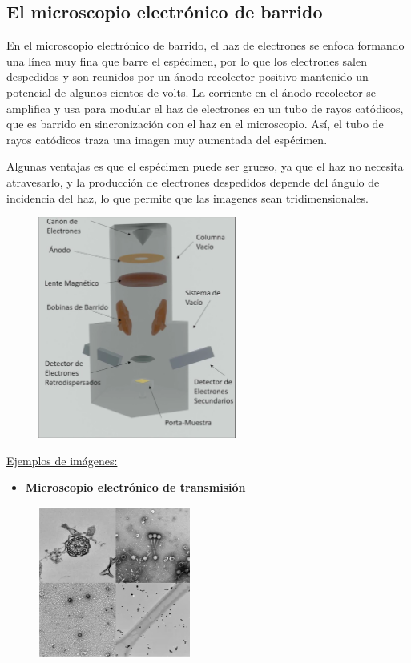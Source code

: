 \documentclass[a4paper]{article}
\begin{document}
\subsection{El microscopio electrónico de barrido}

    \indent En el microscopio electrónico de barrido, el haz de electrones se enfoca formando una línea muy fina que barre el espécimen, por lo que los electrones salen despedidos y son reunidos por un ánodo recolector positivo mantenido un potencial de algunos cientos de volts. La corriente en el ánodo recolector se amplifica y usa para modular el haz de electrones en un tubo de rayos catódicos, que es barrido en sincronización con el haz en el microscopio. Así, el tubo de rayos catódicos traza una imagen muy aumentada del espécimen.\\

    \newpage
    \noindent
    \thispagestyle{fancy}

    \indent Algunas ventajas es que el espécimen puede ser grueso, ya que el haz no necesita atravesarlo, y la producción de electrones despedidos depende del ángulo de incidencia del haz, lo que permite que las imagenes sean tridimensionales.\\

    \begin{figure}[h!]
        \centering
        \includegraphics[width = 6.5cm]{../imagenes/microbarrido.png}
    \end{figure}

\indent \underline{Ejemplos de imágenes:}

    \begin{itemize}
        \item \textbf{Microscopio electrónico de transmisión}
    \end{itemize}

    \begin{figure}[h!]
        \centering
        \includegraphics[width = 5cm]{../imagenes/microtrans.png}
    \end{figure}
\end{document}
